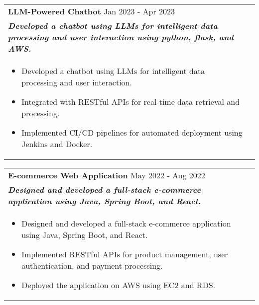 \documentclass[a4paper,3pt]{article}
\begin{document}
\begin{tabularx}{\linewidth}{ @{}l r@{} }
\textbf{LLM-Powered Chatbot} \hspace*{69ex} Jan 2023 - Apr 2023\\[2pt]
\textbf{\textit{Developed a chatbot using LLMs for intelligent data processing and user interaction using python, flask, and AWS.}} \hfill\\[2pt]
\begin{minipage}[t]{\linewidth}
    \begin{itemize}[nosep,after=\strut, leftmargin=2em, itemsep=2pt]
        \item Developed a chatbot using LLMs for intelligent data processing and user interaction.
\item Integrated with RESTful APIs for real-time data retrieval and processing.
\item Implemented CI/CD pipelines for automated deployment using Jenkins and Docker.  
    \end{itemize}
    \end{minipage}
\end{tabularx}
\begin{tabularx}{\linewidth}{ @{}l r@{} }
\textbf{E-commerce Web Application} \hspace*{69ex} May 2022 - Aug 2022\\[2pt]
\textbf{\textit{Designed and developed a full-stack e-commerce application using Java, Spring Boot, and React.}} \hfill\\[2pt]
\begin{minipage}[t]{\linewidth}
    \begin{itemize}[nosep,after=\strut, leftmargin=2em, itemsep=2pt]
        \item Designed and developed a full-stack e-commerce application using Java, Spring Boot, and React.
\item Implemented RESTful APIs for product management, user authentication, and payment processing.
\item Deployed the application on AWS using EC2 and RDS.  
    \end{itemize}
    \end{minipage}
\end{tabularx}
\end{document}
